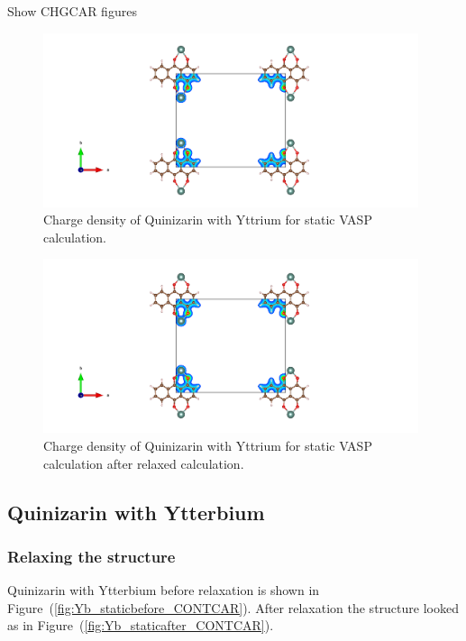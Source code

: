 \documentclass{article}
\begin{document}
      Show CHGCAR figures

      \begin{figure}[H]
        \centering
        \includegraphics[width = 11cm]{../fig/Y_staticbefore_CHGCAR.png}
        \caption{Charge density of Quinizarin with Yttrium for static VASP calculation. }
        \label{fig:Y_staticbefore_CHGCAR}
      \end{figure}

      \begin{figure}[H]
        \centering
        \includegraphics[width = 11cm]{../fig/Y_staticafter_CHGCAR.png}
        \caption{Charge density of Quinizarin with Yttrium for static VASP calculation after relaxed calculation. }
        \label{fig:Y_staticafter_CHGCAR}
      \end{figure}


  \subsection{Quinizarin with Ytterbium}

    \subsubsection{Relaxing the structure}

      Quinizarin with Ytterbium before relaxation is shown in Figure~(\ref{fig:Yb_staticbefore_CONTCAR}). After relaxation the structure looked as in Figure~(\ref{fig:Yb_staticafter_CONTCAR}).
\end{document}
